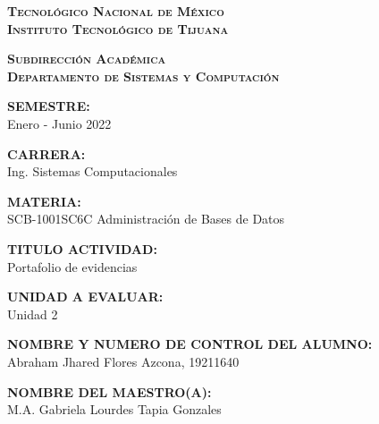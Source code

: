 \documentclass[stu, 12pt, letterpaper, donotrepeattitle, floatsintext, natbib]{apa7}
\begin{document}
    \begin{titlepage}
        \thispagestyle{portada}
        \centering
        \vspace*{0.2cm}
        {\large\scshape\bfseries Tecnológico Nacional de México\\Instituto Tecnológico de Tijuana\par}
        \vspace{0.6cm}
        {\normalsize\scshape\bfseries Subdirección Académica\\Departamento de Sistemas y Computación\par}
        \vspace{0.6cm}
        {{\bfseries SEMESTRE:}\\Enero - Junio 2022\par}
        \vspace{\baselineskip}
        {{\bfseries CARRERA:}\\Ing. Sistemas Computacionales\par}
        \vspace{\baselineskip}
        {{\bfseries MATERIA:}\\SCB-1001SC6C Administración de Bases de Datos\par}
        \vspace{\baselineskip}
        {{\bfseries TITULO ACTIVIDAD:}\\Portafolio de evidencias\par}
        \vspace{\baselineskip}
        {{\bfseries UNIDAD A EVALUAR:}\\Unidad 2 \par}
        \vspace{\baselineskip}
        {{\bfseries NOMBRE Y NUMERO DE CONTROL DEL ALUMNO:}\\Abraham Jhared Flores Azcona, 19211640\par}
        \vspace{\baselineskip}
        {{\bfseries NOMBRE DEL MAESTRO(A):}\\M.A. Gabriela Lourdes Tapia Gonzales\par}
        \vspace{\baselineskip}
    \end{titlepage}

\renewcommand\contentsname{Contenido}
\tableofcontents
\pagebreak
\end{document}

